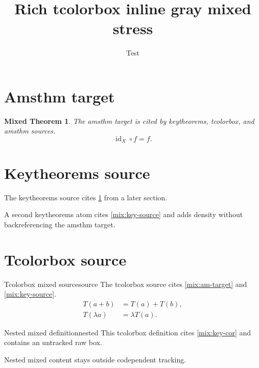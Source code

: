 \documentclass{article}
\title{Rich tcolorbox inline gray mixed stress}
\author{Test}
\date{}
\newtheorem{mixthm}{Mixed Theorem}[section]
\begin{document}
\START
\maketitle

\section{Amsthm target}
\label{sec:mixed-target}

\begin{mixthm}\label{mix:am-target}
The amsthm target is cited by keytheorems, tcolorbox, and amsthm sources.
\begin{equation}\label{eq:mixed-target}
  \operatorname{id}_X\circ f=f.
\end{equation}
\end{mixthm}

\section{Keytheorems source}
\label{sec:mixed-key}

\begin{mixkey}\label{mix:key-source}
The keytheorems source cites \cref{mix:am-target} from a later section.
\end{mixkey}

\begin{mixkeycor}\label{mix:key-cor}
A second keytheorems atom cites \cref{mix:key-source} and adds density without backreferencing the amsthm target.
\end{mixkeycor}

\section{Tcolorbox source}
\label{sec:mixed-tcb}

\begin{mixtcb}[colback=green!5,colframe=green!60!black]{Tcolorbox mixed source}{source}
The tcolorbox source cites \autoref{mix:am-target} and \cref{mix:key-source}.
\begin{align}
  T(a+b) &= T(a)+T(b),\\
  T(\lambda a) &= \lambda T(a).
\end{align}
\end{mixtcb}

\begin{mixtcbdef}{Nested mixed definition}{nested}
This tcolorbox definition cites \cref{mix:key-cor} and contains an untracked raw box.
\begin{innerplain}
Nested mixed content stays outside codependent tracking.
\end{innerplain}
\end{mixtcbdef}
\end{document}
